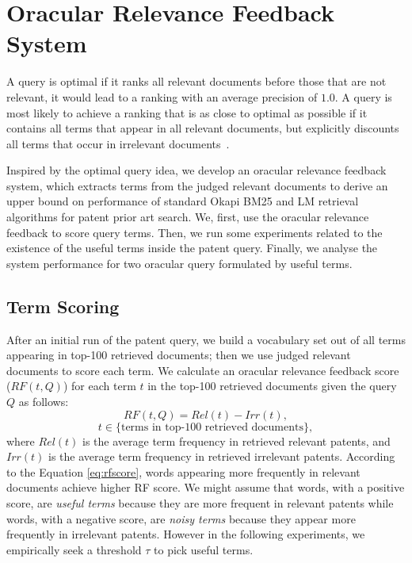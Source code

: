 \section{Oracular Relevance Feedback System}
\label{sec:oraculrquery}
A query is optimal if it ranks all relevant documents before
those that are not relevant, it would lead to a ranking with an average precision of $1.0$. A query
is most likely to achieve a ranking that is as close to optimal as possible if it contains all terms that
appear in all relevant documents, but explicitly discounts all terms that occur in irrelevant documents~\citep{manning2008introduction}.

Inspired by the optimal query idea, we develop an oracular relevance feedback system, which
extracts terms from the judged relevant documents to derive an upper bound on performance of
standard Okapi BM25 and LM retrieval
algorithms for patent prior art search.
We, first, use the oracular relevance feedback to score query terms. 
Then, we run some experiments related to the existence of the useful terms inside the patent query.   
Finally, we analyse the system performance for two oracular query formulated by useful terms. 
\subsection{Term Scoring}
\label{OracularTermSelection}
After an initial run of the patent query, we build a vocabulary set out of all terms appearing in top-100 retrieved documents; then we use judged relevant documents to score each term. 
We calculate an oracular relevance feedback score ($RF(t,Q)$) for each term $t$ in the top-100
retrieved documents given the query $Q$ as follows:
\begin{equation}
RF(t,Q)=Rel(t)-Irr(t), 
 \label{eq:rfscore}
\end{equation}
\begin{displaymath}t\in \lbrace \mbox{terms in top-100 retrieved documents}\rbrace,\end{displaymath}
where $ \mathit{Rel(t)} $ is the average term frequency in retrieved relevant patents, and $ \mathit{Irr(t)} $ is the average term frequency in retrieved irrelevant patents. According to the Equation \ref{eq:rfscore}, words appearing more frequently in relevant documents achieve higher RF score. We might assume that words, with a positive score, are \textit{useful terms} because they are more frequent in relevant patents while words, with a negative score, are \textit{noisy terms} because they appear more frequently in irrelevant patents. However in the following experiments, we empirically seek a threshold $\tau$ to pick useful terms. 

